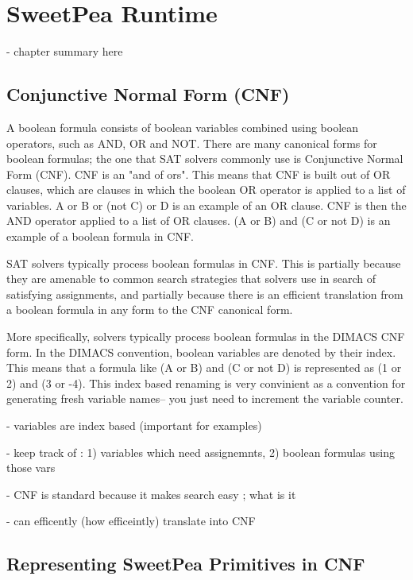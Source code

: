 
\chapter{SweetPea Runtime}

- chapter summary here

\section{Conjunctive Normal Form (CNF)}

A boolean formula consists of boolean variables combined using boolean operators, such as AND, OR and NOT. There are many canonical forms for boolean formulas; the one that SAT solvers commonly use is Conjunctive Normal Form (CNF). CNF is an "and of ors". This means that CNF is built out of OR clauses, which are clauses in which the boolean OR operator is applied to a list of variables. A or B or (not C) or D is an example of an OR clause. CNF is then the AND operator applied to a list of OR clauses. (A or B) and (C or not D) is an example of a boolean formula in CNF.

SAT solvers typically process boolean formulas in CNF. This is partially because they are amenable to common search strategies that solvers use in search of satisfying assignments, and partially because there is an efficient translation from a boolean formula in any form to the CNF canonical form.

More specifically, solvers typically process boolean formulas in the DIMACS CNF form. In the DIMACS convention, boolean variables are denoted by their index. This means that a formula like (A or B) and (C or not D) is represented as (1 or 2) and (3 or -4). This index based renaming is very convinient as a convention for generating fresh variable names-- you just need to increment the variable counter.

- variables are index based (important for examples)

- keep track of : 1) variables which need assignemnts, 2) boolean formulas using those vars

- CNF is standard because it makes search easy ; what is it

- can efficently (how efficeintly) translate into CNF

\section{Representing SweetPea Primitives in CNF}

